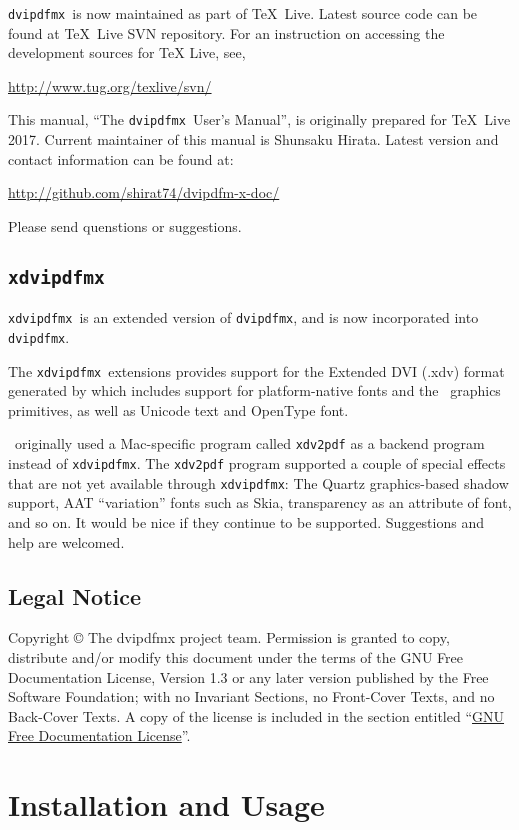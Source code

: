 \documentclass[a4paper,xetex]{article}
\newcommand{\code}[1]{\texttt{#1}}
\newcommand{\dvipdfmx}{\texttt{dvipdfmx}}
\newcommand{\xdvipdfmx}{\texttt{xdvipdfmx}}
\begin{document}
\dvipdfmx\ is now maintained as part of \TeX\ Live. Latest source code can
be found at \TeX\ Live SVN repository. For an instruction on accessing the
development sources for TeX Live, see,\medskip

\url{http://www.tug.org/texlive/svn/}
\medskip

This manual, ``The \dvipdfmx\ User's Manual'', is originally prepared for
\TeX\ Live 2017. Current maintainer of this manual is Shunsaku Hirata.
Latest version and contact information can be found at:\medskip

\url{http://github.com/shirat74/dvipdfm-x-doc/}
\medskip

\noindent{}Please send quenstions or suggestions.

\subsection{\xdvipdfmx}

\xdvipdfmx\ is an extended version of \dvipdfmx, and is now incorporated into
\dvipdfmx.

The \xdvipdfmx\ extensions provides support for the Extended DVI (.xdv) format
generated by \XeTeX which includes support for platform-native fonts and the
\XeTeX\ graphics primitives, as well as Unicode text and OpenType font.

\XeTeX\ originally used a Mac-specific program called \code{xdv2pdf} as a
backend program instead of \xdvipdfmx. The \code{xdv2pdf} program supported
a couple of special effects that are not yet available through \xdvipdfmx:
The Quartz graphics-based shadow support, AAT ``variation'' fonts such as Skia,
transparency as an attribute of font, and so on.
It would be nice if they continue to be supported. Suggestions and help are
welcomed.


\subsection{Legal Notice}

Copyright © The dvipdfmx project team.
Permission is granted to copy, distribute and/or modify this document
under the terms of the GNU Free Documentation License, Version 1.3
or any later version published by the Free Software Foundation;
with no Invariant Sections, no Front-Cover Texts, and no Back-Cover Texts.
A copy of the license is included in the section entitled
``\hyperref[SEC:FDL]{GNU Free Documentation License}''.

\section{Installation and Usage}
\end{document}
